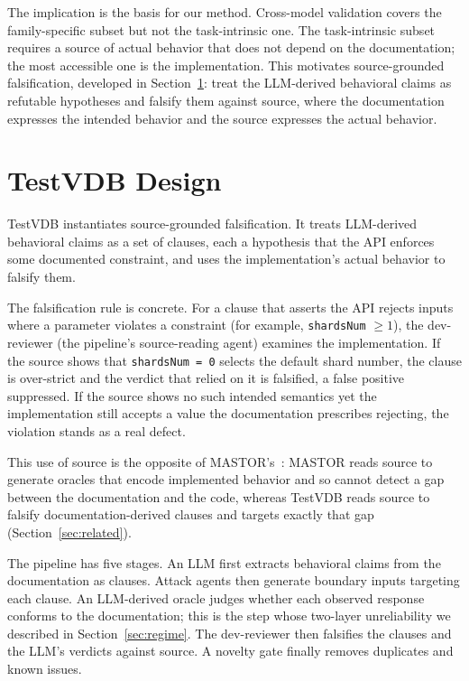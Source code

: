 \documentclass[sigconf]{acmart}
\begin{document}
The implication is the basis for our method. Cross-model validation covers the family-specific subset but not the task-intrinsic one. The task-intrinsic subset requires a source of actual behavior that does not depend on the documentation; the most accessible one is the implementation. This motivates source-grounded falsification, developed in Section~\ref{sec:design}: treat the LLM-derived behavioral claims as refutable hypotheses and falsify them against source, where the documentation expresses the intended behavior and the source expresses the actual behavior.

\section{TestVDB Design} \label{sec:design}

TestVDB instantiates source-grounded falsification. It treats LLM-derived behavioral claims as a set of clauses, each a hypothesis that the API enforces some documented constraint, and uses the implementation's actual behavior to falsify them.

The falsification rule is concrete. For a clause that asserts the API rejects inputs where a parameter violates a constraint (for example, \texttt{shardsNum} $\geq 1$), the dev-reviewer (the pipeline's source-reading agent) examines the implementation. If the source shows that \texttt{shardsNum = 0} selects the default shard number, the clause is over-strict and the verdict that relied on it is falsified, a false positive suppressed. If the source shows no such intended semantics yet the implementation still accepts a value the documentation prescribes rejecting, the violation stands as a real defect.

This use of source is the opposite of MASTOR's~\cite{mastor26}: MASTOR reads source to generate oracles that encode implemented behavior and so cannot detect a gap between the documentation and the code, whereas TestVDB reads source to falsify documentation-derived clauses and targets exactly that gap (Section~\ref{sec:related}).

The pipeline has five stages. An LLM first extracts behavioral claims from the documentation as clauses. Attack agents then generate boundary inputs targeting each clause. An LLM-derived oracle judges whether each observed response conforms to the documentation; this is the step whose two-layer unreliability we described in Section~\ref{sec:regime}. The dev-reviewer then falsifies the clauses and the LLM's verdicts against source. A novelty gate finally removes duplicates and known issues.
\end{document}
